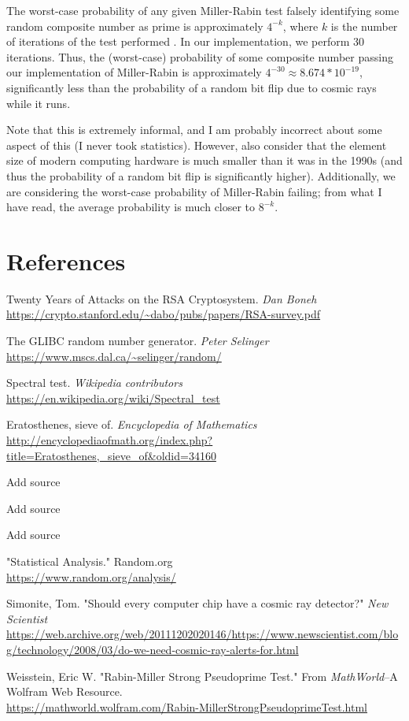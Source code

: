 \documentclass{article}
\begin{document}
The worst-case probability of any given Miller-Rabin test falsely identifying some random composite number as prime is approximately $4^{-k }$, where $k$ is the number of iterations of the test performed \cite{wolfram}. In our implementation, we perform 30 iterations. Thus, the (worst-case) probability of some composite number passing our implementation of Miller-Rabin is approximately $4^{-30} \approx 8.674 * 10^{-19}$, significantly less than the probability of a random bit flip due to cosmic rays while it runs.

Note that this is extremely informal, and I am probably incorrect about some aspect of this (I never took statistics). However, also consider that the element size of modern computing hardware is much smaller than it was in the 1990s (and thus the probability of a random bit flip is significantly higher). Additionally, we are considering the worst-case probability of Miller-Rabin failing; from what I have read, the average probability is much closer to $8^{-k}$.


\section{References}
\begin{thebibliography}{6}
Twenty Years of Attacks on the RSA Cryptosystem.
\textit{Dan Boneh}
\\\url{https://crypto.stanford.edu/~dabo/pubs/papers/RSA-survey.pdf}

The GLIBC random number generator.
\textit{Peter Selinger}
\\\url{https://www.mscs.dal.ca/~selinger/random/}

Spectral test.
\textit{Wikipedia contributors}
\\\url{https://en.wikipedia.org/wiki/Spectral_test}

Eratosthenes, sieve of.
\textit{Encyclopedia of Mathematics}\\
\url{http://encyclopediaofmath.org/index.php?title=Eratosthenes,_sieve_of&oldid=34160}

Add source

Add source

Add source

"Statistical Analysis." Random.org
\\\url{https://www.random.org/analysis/}

Simonite, Tom. "Should every computer chip have a cosmic ray detector?" \textit{New Scientist}
\\\url{https://web.archive.org/web/20111202020146/https://www.newscientist.com/blog/technology/2008/03/do-we-need-cosmic-ray-alerts-for.html}

Weisstein, Eric W. "Rabin-Miller Strong Pseudoprime Test." From \textit{MathWorld}--A Wolfram Web Resource.
\\\url{https://mathworld.wolfram.com/Rabin-MillerStrongPseudoprimeTest.html}
\end{thebibliography}
         
\end{document}
